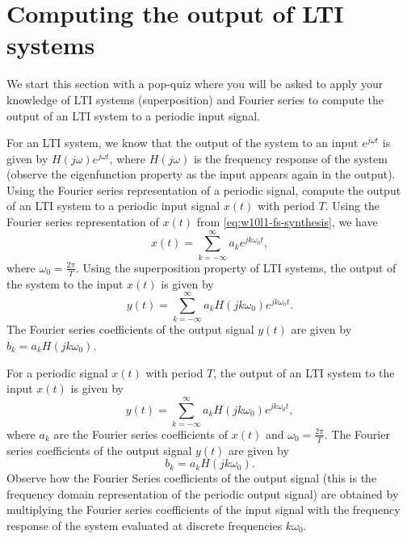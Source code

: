 \section{Computing the output of LTI systems}
We start this section with a pop-quiz where you will be asked to apply your knowledge of LTI systems (superposition) and Fourier series to compute the output of an LTI system to a periodic input signal.
\begin{popquiz}
For an LTI system, we know that the output of the system to an input $e^{j \omega t}$ is given by $H(j \omega) e^{j \omega t}$, where $H(j \omega)$ is the frequency response of the system (observe the eigenfunction property as the input appears again in the output). Using the Fourier series representation of a periodic signal, compute the output of an LTI system to a periodic input signal $x(t)$ with period $T$.
\popqsplit 
Using the Fourier series representation of $x(t)$ from \eqref{eq:w10l1-fs-synthesis}, we have
\[
x(t) = \sum_{k=-\infty}^{\infty} a_k e^{j k \omega_0 t},
\]
where $\omega_0 = \frac{2\pi}{T}$. Using the superposition property of LTI systems, the output of the system to the input $x(t)$ is given by
\[
y(t) = \sum_{k=-\infty}^{\infty} a_k H(j k \omega_0) e^{j k \omega_0 t}.
\]
The Fourier series coefficients of the output signal $y(t)$ are given by $b_k = a_k H(j k \omega_0)$.
\end{popquiz}
For a periodic signal $x(t)$ with period $T$, the output of an LTI system to the input $x(t)$ is given by
\[
y(t) = \sum_{k=-\infty}^{\infty} a_k H(j k \omega_0) e^{j k \omega_0 t},
\]
where $a_k$ are the Fourier series coefficients of $x(t)$ and $\omega_0 = \frac{2\pi}{T}$.
The Fourier series coefficients of the output signal $y(t)$ are given by
\[
b_k = a_k H(j k \omega_0).
\]
Observe how the Fourier Series coefficients of the output signal (this is the frequency domain representation of the periodic output signal) are obtained by multiplying the Fourier series coefficients of the input signal with the frequency response of the system evaluated at discrete frequencies $k \omega_0$.
